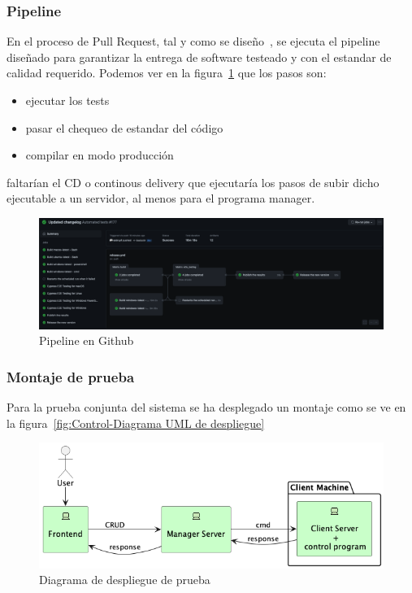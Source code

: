 
\subsubsection{Pipeline}

En el proceso de Pull Request, tal y como se diseño~, se ejecuta el pipeline diseñado para garantizar la entrega de software testeado y con el estandar de calidad requerido. Podemos ver en la figura~\cref{fig:githubActions} que los pasos son:

\begin{itemize}
    \item ejecutar los tests
    \item pasar el chequeo de estandar del código
    \item compilar en modo producción
\end{itemize}

faltarían el CD o continous delivery que ejecutaría los pasos de subir dicho ejecutable a un servidor, al menos para el programa manager.

\begin{figure}[H]
    \centering
    \includegraphics[height=0.2\textheight]{./part/Ejecucion/Seguimiento/PuestaAPunto/img/githubPipelines}
    \caption{Pipeline en Github}\label{fig:githubActions}
\end{figure}

\subsubsection{Montaje de prueba}

Para la prueba conjunta del sistema se ha desplegado un montaje como se ve en la figura~\cref{fig:Control-Diagrama UML de despliegue}

\begin{figure}[H]
    \centering
    \includegraphics[height=0.2\textheight]{./part/Ejecucion/Seguimiento/PuestaAPunto/img/deploy}
    \caption{Diagrama de despliegue de prueba}\label{fig:despliegue de prueba}
\end{figure}

